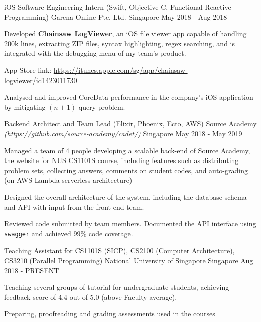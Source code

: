 \begin{cventries}
  \cventry
  {iOS Software Engineering Intern (Swift, Objective-C, Functional Reactive Programming)} %
  {Garena Online Pte. Ltd.} %
  {Singapore} %
  {May 2018 - Aug 2018} %
  {
    \begin{cvitems}
      \item {Developed \textbf{Chainsaw LogViewer}, an iOS file viewer app capable of handling 200k lines, extracting ZIP files, syntax highlighting, regex searching, and is integrated with the debugging menu of my team's product.}
      \item {App Store link: \url{https://itunes.apple.com/sg/app/chainsaw-logviewer/id1423011730}}
      \item {Analysed and improved CoreData performance in the company's iOS application by mitigating $(n+1)$ query problem.}
    \end{cvitems}
  }

  \cventry
  {Backend Architect and Team Lead (Elixir, Phoenix, Ecto, AWS)} %
  {Source Academy \textmd{\em\tiny(\url{https://github.com/source-academy/cadet/})}} %
  {Singapore} %
  {May 2018 - May 2019} %
  {
    \begin{cvitems}
      \item {Managed a team of 4 people developing a scalable back-end of Source Academy, the website for NUS CS1101S course, including features such as distributing problem sets, collecting answers, comments on student codes, and auto-grading (on AWS Lambda serverless architecture)}
      \item {Designed the overall architecture of the system, including the database schema and API with input from the front-end team.}
      \item {Reviewed code submitted by team members. Documented the API interface using \texttt{swagger} and achieved 99\% code coverage.}
    \end{cvitems}
  }
  \cventry
  {Teaching Assistant for CS1101S (SICP), CS2100 (Computer Architecture), CS3210 (Parallel Programming)} %
  {National University of Singapore} %
  {Singapore} %
  {Aug 2018 - PRESENT} %
  {
    \begin{cvitems}
      \item {Teaching several groups of tutorial for undergraduate students, achieving feedback score of 4.4 out of 5.0 (above Faculty average).}
      \item {Preparing, proofreading and grading assessments used in the courses}
    \end{cvitems}
  }

\end{cventries}
